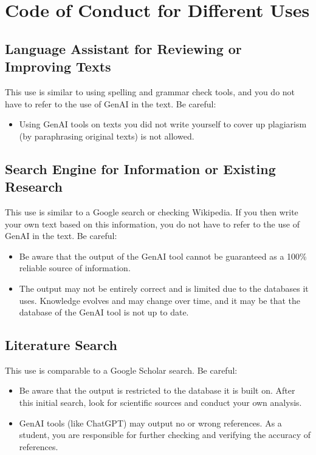 \section*{Code of Conduct for Different Uses}
\subsection*{Language Assistant for Reviewing or Improving Texts}
This use is similar to using spelling and grammar check tools, and you do not have to refer to the use of GenAI in the text. Be careful:
\begin{itemize}
    \item Using GenAI tools on texts you did not write yourself to cover up plagiarism (by paraphrasing original texts) is not allowed.
\end{itemize}

\subsection*{Search Engine for Information or Existing Research}
This use is similar to a Google search or checking Wikipedia. If you then write your own text based on this information, you do not have to refer to the use of GenAI in the text. Be careful:
\begin{itemize}
    \item Be aware that the output of the GenAI tool cannot be guaranteed as a 100\% reliable source of information.
    \item The output may not be entirely correct and is limited due to the databases it uses. Knowledge evolves and may change over time, and it may be that the database of the GenAI tool is not up to date.
\end{itemize}

\subsection*{Literature Search}
This use is comparable to a Google Scholar search. Be careful:
\begin{itemize}
    \item Be aware that the output is restricted to the database it is built on. After this initial search, look for scientific sources and conduct your own analysis.
    \item GenAI tools (like ChatGPT) may output no or wrong references. As a student, you are responsible for further checking and verifying the accuracy of references.
\end{itemize}

